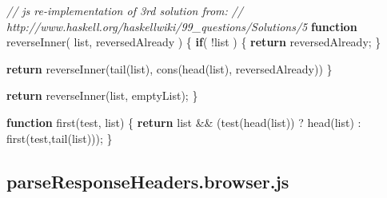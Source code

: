 \documentclass[12pt, ]{article}
\newenvironment{Shaded}{}{}
\newcommand{\KeywordTok}[1]{\textcolor[rgb]{0.00,0.44,0.13}{\textbf{{#1}}}}
\newcommand{\CommentTok}[1]{\textcolor[rgb]{0.38,0.63,0.69}{\textit{{#1}}}}
\newcommand{\FunctionTok}[1]{\textcolor[rgb]{0.02,0.16,0.49}{{#1}}}
\newcommand{\NormalTok}[1]{{#1}}
\begin{document}
\begin{Shaded}
\begin{Highlighting}[]
   \CommentTok{// js re-implementation of 3rd solution from:}
   \CommentTok{//    http://www.haskell.org/haskellwiki/99_questions/Solutions/5}
   \KeywordTok{function} \FunctionTok{reverseInner}\NormalTok{( list, reversedAlready ) \{}
      \KeywordTok{if}\NormalTok{( !list ) \{}
         \KeywordTok{return} \NormalTok{reversedAlready;}
      \NormalTok{\}}
      
      \KeywordTok{return} \FunctionTok{reverseInner}\NormalTok{(}\FunctionTok{tail}\NormalTok{(list), }\FunctionTok{cons}\NormalTok{(}\FunctionTok{head}\NormalTok{(list), reversedAlready))}
   \NormalTok{\}}

   \KeywordTok{return} \FunctionTok{reverseInner}\NormalTok{(list, emptyList);}
\NormalTok{\}}

\KeywordTok{function} \FunctionTok{first}\NormalTok{(test, list) \{}
   \KeywordTok{return}   \NormalTok{list &&}
               \NormalTok{(}\FunctionTok{test}\NormalTok{(}\FunctionTok{head}\NormalTok{(list)) }
                  \NormalTok{? }\FunctionTok{head}\NormalTok{(list) }
                  \NormalTok{: }\FunctionTok{first}\NormalTok{(test,}\FunctionTok{tail}\NormalTok{(list))); }
\NormalTok{\}}
\end{Highlighting}
\end{Shaded}

\pagebreak

\subsection{parseResponseHeaders.browser.js}\label{headerux5fparseResponseHeaders.browser}

\label{src_parseResponseHeaders.browser}
\end{document}
